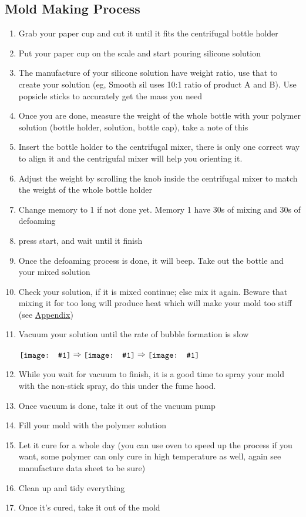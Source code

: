 \documentclass{article}
\newcommand{\TeaserImage}[1]{\raisebox{%
  .5\dimexpr-\height+\ht\strutbox-\dp\strutbox}{%
  \texttt{[image: \#1]}}}
\begin{document}
\subsection{Mold Making Process}
\begin{enumerate}
    \item Grab your paper cup and cut it until it fits the centrifugal bottle holder
    \item Put your paper cup on the scale and start pouring silicone solution
    \item The manufacture of your silicone solution have weight ratio, use that to create your solution (eg, Smooth sil uses 10:1 ratio of product A and B). Use popsicle sticks to accurately get the mass you need 
    \item Once you are done, measure the weight of the whole bottle with your polymer solution (bottle holder, solution, bottle cap), take a note of this
    \item Insert the bottle holder to the centrifugal mixer, there is only one correct way to align it and the centrigufal mixer will help you orienting it.
    \item Adjust the weight by scrolling the knob inside the centrifugal mixer to match the weight of the whole bottle holder
    \item Change memory to 1 if not done yet. Memory 1 have 30s of mixing and 30s of defoaming
    \item press start, and wait until it finish
    \item Once the defoaming process is done, it will beep. Take out the bottle and your mixed solution
    \item Check your solution, if it is mixed continue; else mix it again. Beware that mixing it for too long will produce heat which will make your mold too stiff (see \href{Mold_Tables}{Appendix})
    \item Vacuum your solution until the rate of bubble formation is slow\\
        \begin{centering}
        $%
    \TeaserImage{img/Vacuum_1.jpg}
    \Rightarrow
    \TeaserImage{img/Vacuum_2.jpg}
    \Rightarrow
    \TeaserImage{img/Vacuum_3.jpg}
    $
\end{centering}
    \item While you wait for vacuum to finish, it is a good time to spray your mold with the non-stick spray, do this under the fume hood.
    \item Once vacuum is done, take it out of the vacuum pump
    \item Fill your mold with the polymer solution
    \item Let it cure for a whole day (you can use oven to speed up the process if you want, some polymer can only cure in high temperature as well, again see manufacture data sheet to be sure)
    \item Clean up and tidy everything
    \item Once it's cured, take it out of the mold
\end{enumerate}
\end{document}
